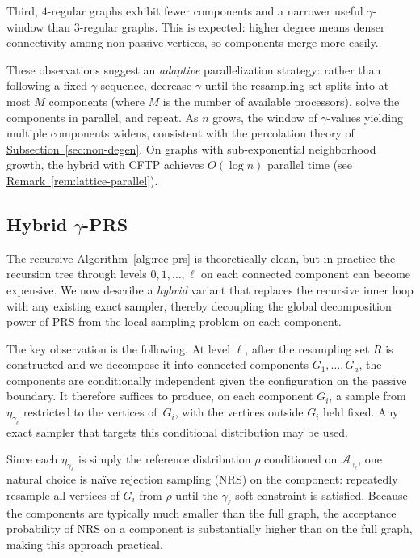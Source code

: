 \documentclass[12pt, a4paper]{article}
\theoremstyle{plain}
\theoremstyle{definition}
\theoremstyle{remark}
\newcommand{\mc}{\mathcal}
\newcommand{\sref}[2]{\hyperref[#2]{#1~\ref*{#2}}}
\begin{document}
Third, \(4\)-regular graphs exhibit fewer components and a narrower useful \(\gamma\)-window than \(3\)-regular graphs. This is expected: higher degree means denser connectivity among non-passive vertices, so components merge more easily.

These observations suggest an {\em adaptive} parallelization strategy: rather than following a fixed \(\gamma\)-sequence, decrease \(\gamma\) until the resampling set splits into at most \(M\) components (where \(M\) is the number of available processors), solve the components in parallel, and repeat. As \(n\) grows, the window of \(\gamma\)-values yielding multiple components widens, consistent with the percolation theory of \sref{Subsection}{sec:non-degen}. On graphs with sub-exponential neighborhood growth, the hybrid with CFTP achieves \(O(\log n)\) parallel time (see \sref{Remark}{rem:lattice-parallel}).

\subsection{Hybrid \(\gamma\)-PRS}\label{sec:hybrid}

The recursive \sref{Algorithm}{alg:rec-prs} is theoretically clean, but in practice the recursion tree through levels \(0,1,\ldots,\ell\) on each connected component can become expensive. We now describe a {\em hybrid} variant that replaces the recursive inner loop with any existing exact sampler, thereby decoupling the global decomposition power of PRS from the local sampling problem on each component.

The key observation is the following. At level \(\ell\), after the resampling set \(R\) is constructed and we decompose it into connected components \(G_1,\ldots,G_a\), the components are conditionally independent given the configuration on the passive boundary. It therefore suffices to produce, on each component \(G_i\), a sample from \(\eta_{\gamma_\ell}\) restricted to the vertices of~\(G_i\), with the vertices outside \(G_i\) held fixed. Any exact sampler that targets this conditional distribution may be used.

Since each \(\eta_{\gamma_\ell}\) is simply the reference distribution \(\rho\) conditioned on \(\mc{A}_{\gamma_\ell}\), one natural choice is na\"{i}ve rejection sampling (NRS) on the component: repeatedly resample all vertices of \(G_i\) from \(\rho\) until the \(\gamma_\ell\)-soft constraint is satisfied. Because the components are typically much smaller than the full graph, the acceptance probability of NRS on a component is substantially higher than on the full graph, making this approach practical.
\end{document}
